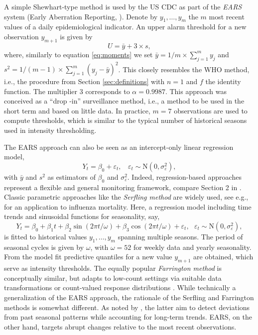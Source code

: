 \documentclass[12pt]{article}
\begin{document}
A simple Shewhart-type method is used by the US CDC as part of the \textit{EARS} system (Early Aberration Reporting, \citealt{Hutwagner2003}). Denote by $y_1, \dots, y_m$ the $m$ most recent values of a daily epidemiological indicator. An upper alarm threshold for a new observation $y_{m + 1}$ is given by
$$
U = \bar{y} + 3 \times s,
$$ 
where, similarly to equation \eqref{eq:moments} we set $\bar{y} = 1/m \times \sum_{j = 1}^m y_j$ and $s^2 = 1/(m - 1) \times \sum_{j = 1}^m (y_j - \bar{y})^2$. This closely resembles the WHO method, i.e., the procedure from Section \ref{sec:definitions} with $n = 1$ and $f$ the identity function. The multiplier 3 corresponds to $\alpha = 0.9987$. This approach was conceived as a ``drop -in'' surveillance method, i.e., a method to be used in the short term and based on little data. In practice, $m = 7$ observations are used to compute thresholds, which is similar to the typical number of historical seasons used in intensity thresholding.

The EARS approach can also be seen as an intercept-only linear regression model,
$$
Y_{t} = \beta_0 + \varepsilon_{t}, \ \ \ \ \varepsilon_t \sim \text{N}(0, \sigma_\varepsilon^2),
$$
with $\bar{y}$ and $s^2$ as estimators of $\beta_0$ and $\sigma_\varepsilon^2$. Indeed, regression-based approaches represent a flexible and general monitoring framework, compare Section 2 in \cite{Unkel2012}. Classic parametric approaches like the \textit{Serfling method} \citep{Serfling1896} are widely used, see e.g., \cite{Thompson2009} for an application to influenza mortality. Here, a regression model including time trends and sinusoidal functions for seasonality, say,
\begin{equation}
Y_{t} = \beta_0 + \beta_1 t + \beta_2 \sin(2\pi t / \omega) + \beta_3 \cos(2\pi t / \omega) + \varepsilon_t, \ \ \ \varepsilon_t \sim \text{N}(0, \sigma_\varepsilon^2),
\label{eq:serfling}
\end{equation}
is fitted to historical values $y_1, \dots, y_m$ spanning multiple seasons. The period of seasonal cycles is given by $\omega$, with $\omega = 52$ for weekly data and yearly seasonality. From the model fit predictive quantiles for a new value $y_{m + 1}$ are obtained, which serve as intensity thresholds. The equally popular \textit{Farrington method} is conceptually similar, but adapts to low-count settings via suitable data transformations \citep{Farrington1996} or count-valued response distributions \citep{Noufaily2013}. While technically a generalization of the EARS approach, the rationale of the Serfling and Farrington methods is somewhat different. As noted by \cite{Hutwagner2003}, the latter aim to detect deviations from past seasonal patterns while accounting for long-term trends. EARS, on the other hand, targets abrupt changes relative to the most recent observations.
\end{document}
